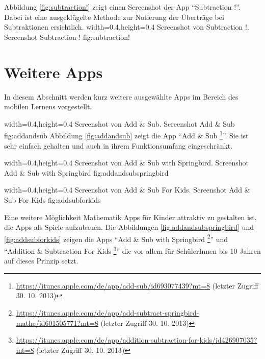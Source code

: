 Abbildung \ref{fig:subtraction!} zeigt einen Screenshot der App \enquote{Subtraction !}. Dabei ist 
eine ausgeklügelte Methode zur Notierung der Überträge bei Subtraktionen ersichtlich.
  {width=0.4\textwidth,height=0.4\textheight}%
  {Screenshot von Subtraction !.}%
  {Screenshot Subtraction !}%
  {fig:subtraction!}%


\section{Weitere Apps}

In diesem Abschnitt werden kurz weitere ausgewählte Apps im Bereich des mobilen Lernens vorgestellt.

  {width=0.4\textwidth,height=0.4\textheight}%
  {Screenshot von Add \& Sub.}%
  {Screenshot Add \& Sub}%
  {fig:addandsub}%
Abbildung \ref{fig:addandsub} zeigt die App \enquote{Add \& Sub \footnote{\url{https://itunes.apple.com/de/app/add-sub/id693077439?mt=8} (letzter Zugriff 30. 10. 2013)}}. Sie ist sehr einfach gehalten und auch 
in ihrem Funktionsumfang eingeschränkt.

  {width=0.4\textwidth,height=0.4\textheight}%
  {Screenshot von Add \& Sub with Springbird.}%
  {Screenshot Add \& Sub with Springbird}%
  {fig:addandsubspringbird}%

  {width=0.4\textwidth,height=0.4\textheight}%
  {Screenshot von Add \& Sub For Kids.}%
  {Screenshot Add \& Sub For Kids}%
  {fig:addsubforkids}%

Eine weitere Möglichkeit Mathematik Apps für Kinder attraktiv zu gestalten ist, die Apps als Spiele
aufzubauen. Die Abbildungen \ref{fig:addandsubspringbird} und \ref{fig:addsubforkids} zeigen die Apps
\enquote{Add \& Sub with Springbird \footnote{\url{https://itunes.apple.com/de/app/add-subtract-springbird-mathe/id601505771?mt=8} (letzter Zugriff 30. 10. 2013)}}
und
\enquote{Addition \& Subtraction For Kids \footnote{\url{https://itunes.apple.com/de/app/addition-subtraction-for-kids/id426907035?mt=8} (letzter Zugriff 30. 10. 2013)}}
die vor allem für SchülerInnen bis 10 Jahren auf dieses Prinzip setzt.


